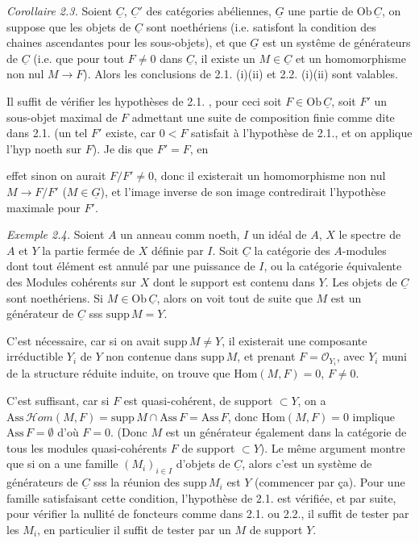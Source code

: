 \documentclass[11pt,a4paper]{article}
\begin{document}
\emph{Corollaire 2.3.} Soient $\underline{C}$, $\underline{C}'$ des catégories abéliennes, $\underline{G}$ une partie de $\mathrm{Ob}\,\underline{C}$, on suppose que les objets de $\underline{C}$ sont noethériens (i.e. satisfont la condition des chaines ascendantes pour les sous-objets), et que $\underline{G}$ est un systême de générateurs de $\underline{C}$ (i.e. que pour tout $F \neq 0$ dans $\underline{C}$, il existe un $M \in \underline{C}$ et un homomorphisme non nul $M \to F$). Alors les conclusions de 2.1. (i)(ii) et 2.2. (i)(ii) sont valables.

Il suffit de vérifier les hypothèses de 2.1. , pour ceci soit $F \in \mathrm{Ob}\,\underline{C}$, \struck{\ill{}} soit $F'$ un sous-objet maximal de $F$ admettant une suite de composition finie comme dite dans 2.1. (un tel $F'$ existe, car $0 < F$ satisfait à l'hypothèse de 2.1., et on applique l'hyp noeth sur $F$). Je dis que $F' = F$, en

effet sinon on aurait $F/F' \neq 0$, donc il existerait un homomorphisme non nul $M \to F/F'$ ($M \in \underline{G}$), et l'image inverse  de son image  contredirait l'hypothèse maximale pour $F'$.

\emph{Exemple 2.4.} Soient $A$ un anneau comm noeth, $I$ un idéal de $A$, $X$ le spectre de $A$ et $Y$ la partie fermée de $X$ définie par $I$. Soit $\underline{C}$ la catégorie des $A$-modules  dont tout élément est annulé par une puissance de $I$, ou la catégorie équivalente des Modules cohérents sur $X$ dont le support est contenu dans $Y$. Les objets de $\underline{C}$ sont noethériens. Si $M \in \mathrm{Ob}\,\underline{C}$, alors on voit tout de suite que $M$ est un générateur de $\underline{C}$ sss $\mathrm{supp}\, M = Y$.

C'est nécessaire, car si on avait $\mathrm{supp}\, M \neq Y$, il existerait une composante irréductible $Y_i$ de $Y$ non contenue dans $\mathrm{supp}\, M$, et prenant $F = \mathcal{O}_{Y_i}$, avec $Y_i$ muni de la structure réduite induite, on trouve que $\mathrm{Hom}(M,F) = 0$, $F \neq 0$.

C'est suffisant, car si $F$ est quasi-cohérent, de support $\subset Y$, on a $\mathrm{Ass}\,\mathcal{H}om(M,F) = \mathrm{supp}\, M \cap \mathrm{Ass}\, F = \mathrm{Ass}\, F$, donc $\mathrm{Hom}(M,F) = 0$ implique $\mathrm{Ass}\, F = \emptyset$ d'où $F = 0$. (Donc $M$ est un générateur également dans la catégorie de tous les modules quasi-cohérents $F$ de support $\subset Y$).  Le même argument montre que si on a une famille $(M_i)_{i \in I}$ d'objets de $\underline{C}$, alors c'est un système de générateurs de $\underline{C}$ sss la réunion des $\mathrm{supp}\, M_i$ est $Y$ (commencer par ça). Pour une famille satisfaisant cette condition, l'hypothèse de 2.1. est vérifiée, et par suite, pour vérifier la nullité de foncteurs comme dans 2.1. ou 2.2., il suffit de tester par les $M_i$,  en particulier il suffit de tester par un $M$ de support $Y$.
\end{document}
